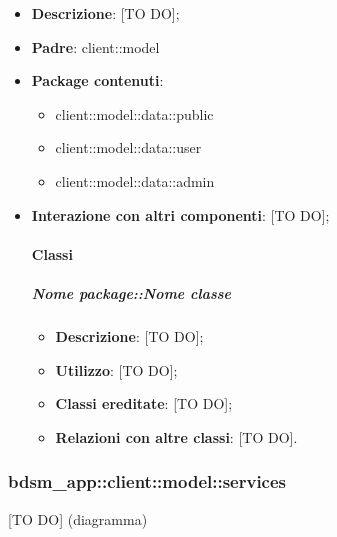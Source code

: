\begin{itemize}
	\item \textbf{Descrizione}: [TO DO];
	\item \textbf{Padre}: client::model
	\item \textbf{Package contenuti}:
		\begin{itemize}
			\item client::model::data::public
			\item client::model::data::user
			\item client::model::data::admin
		\end{itemize}
	\item \textbf{Interazione con altri componenti}: [TO DO];
	
	\paragraph{Classi} %
		\subparagraph{Nome package::Nome classe} %
		\label{subp:subparagraph_name}
			\begin{itemize}
				\item \textbf{Descrizione}: [TO DO];
				\item \textbf{Utilizzo}: [TO DO];
				\item \textbf{Classi ereditate}: [TO DO];
				\item \textbf{Relazioni con altre classi}: [TO DO].
			\end{itemize}
\end{itemize}



\subsubsection{bdsm\_app::client::model::services} %
\label{ssub:bdsm_app_client_model_services}
[TO DO] (diagramma) \newline \newline

